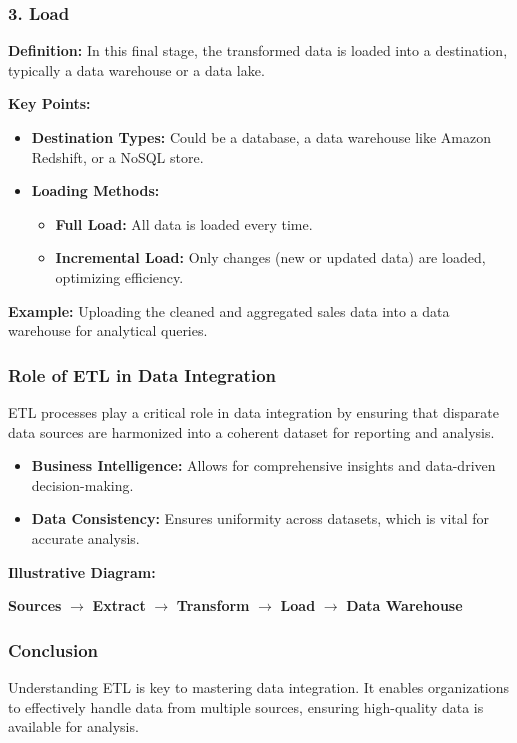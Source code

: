 \documentclass[aspectratio=169]{beamer}
\begin{document}
\begin{frame}[fragile]
    \frametitle{3. Load}
    \textbf{Definition:} In this final stage, the transformed data is loaded into a destination, typically a data warehouse or a data lake.

    \textbf{Key Points:}
    \begin{itemize}
        \item \textbf{Destination Types:} Could be a database, a data warehouse like Amazon Redshift, or a NoSQL store.
        \item \textbf{Loading Methods:}
        \begin{itemize}
            \item \textbf{Full Load:} All data is loaded every time.
            \item \textbf{Incremental Load:} Only changes (new or updated data) are loaded, optimizing efficiency.
        \end{itemize}
    \end{itemize}

    \textbf{Example:} Uploading the cleaned and aggregated sales data into a data warehouse for analytical queries.
\end{frame}

\begin{frame}[fragile]
    \frametitle{Role of ETL in Data Integration}
    ETL processes play a critical role in data integration by ensuring that disparate data sources are harmonized into a coherent dataset for reporting and analysis.

    \begin{itemize}
        \item \textbf{Business Intelligence:} Allows for comprehensive insights and data-driven decision-making.
        \item \textbf{Data Consistency:} Ensures uniformity across datasets, which is vital for accurate analysis.
    \end{itemize}

    \textbf{Illustrative Diagram:} 
    \begin{center}
        \textbf{Sources} $\rightarrow$ \textbf{Extract} $\rightarrow$ \textbf{Transform} $\rightarrow$ \textbf{Load} $\rightarrow$ \textbf{Data Warehouse}
    \end{center}
\end{frame}

\begin{frame}[fragile]
    \frametitle{Conclusion}
    Understanding ETL is key to mastering data integration. It enables organizations to effectively handle data from multiple sources, ensuring high-quality data is available for analysis.
\end{frame}
\end{document}
